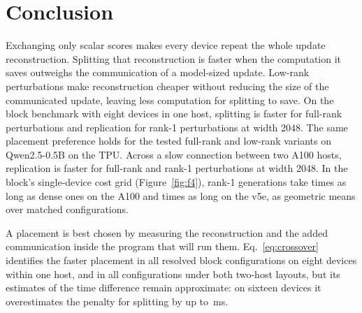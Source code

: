 \section{Conclusion}

Exchanging only scalar scores makes every device repeat the whole update reconstruction.
Splitting that reconstruction is faster when the computation it saves outweighs the
communication of a model-sized update. Low-rank perturbations make reconstruction cheaper
without reducing the size of the communicated update, leaving less computation for splitting
to save. On the block benchmark with eight devices in one host, splitting is faster for
full-rank perturbations and replication for rank-1 perturbations at width 2048. The same
placement preference holds for the tested full-rank and low-rank variants on Qwen2.5-0.5B on
the TPU. Across a slow connection between two A100 hosts, replication is faster for full-rank
and rank-1 perturbations at width 2048. In the block's
single-device cost grid (Figure~\ref{fig:f4}), rank-1 generations take
\RankOneOverDenseGPU{} times as long as dense ones on the A100 and \RankOneOverDenseTPU{}
times as long on the v5e, as geometric means over matched configurations.

A placement is best chosen by measuring the reconstruction and the added communication inside
the program that will run them. Eq.~\ref{eq:crossover} identifies the faster placement in all
\ModelResolved{} resolved block configurations on eight devices within one host, and in all
\HostExpectedMatches{} configurations under both two-host layouts, but its estimates of the
time difference remain approximate: on sixteen devices it overestimates the penalty for
splitting by up to \HostExpectedOverSixteen\,ms.

